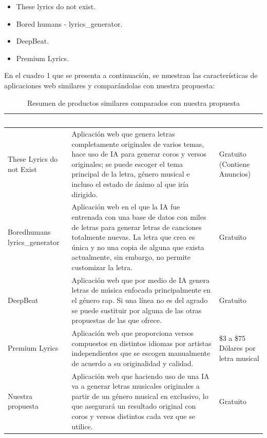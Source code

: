 \documentclass[12pt, a4paper, titlepage]{report}
\begin{document}
    \begin{itemize}
    	\item These lyrics do not exist.
    	\item Bored humans - lyrics\_generator.
    	\item DeepBeat.
    	\item Premium Lyrics.
    \end{itemize}
	\newpage
	En el cuadro 1 que se presenta a continuación, se muestran las características de aplicaciones web similares y comparándolas con nuestra propuesta:
	\begin{table}[!htbp]
		\begin{tabular}{|m{3.5cm}|m{6.5cm}|m{3.5cm}|}
			\hline    			
			\rowcolor{guindapoli}
			\hfil {\textbf{\textcolor{white}{Software}}} & \hfil {\textbf{\textcolor{white}{Características}}} & \hfil {\textbf{\textcolor{white}{Precio}}} \\
			\hline
			These Lyrics do not Exist & Aplicación web que genera letras completamente originales de varios temas, hace uso de IA para generar coros y versos originales; se puede escoger el tema principal de la letra, género musical e incluso el estado de ánimo al que iría dirigido. & Gratuito (Contiene Anuncios) \\
			\hline
			Boredhumans lyrics\_generator & Aplicación web en el que la IA fue entrenada con una base de datos con miles de letras para generar letras de canciones totalmente nuevas. La letra que crea es única y no una copia de alguna que exista actualmente, sin embargo, no permite customizar la letra. & \hfil Gratuito \\
			\hline
			\hfil DeepBeat & Aplicación web que por medio de IA genera letras de música enfocada principalmente en el género rap. Si una línea no es del agrado se puede sustituir por alguna de las otras propuestas de las que ofrece. & \hfil Gratuito \\
			\hline
			\hfil Premium Lyrics & Aplicación web que proporciona versos compuestos en distintos idiomas por artistas independientes que se escogen manualmente de acuerdo a su originalidad y calidad. & \$3 a \$75 Dólares por letra musical \\
			\hline
			\hfil Nuestra propuesta & Aplicación web que haciendo uso de una IA va a generar letras musicales originales a partir de un género musical en exclusivo, lo que asegurará un resultado original con coros y versos distintos cada vez que se utilice. & \hfil Gratuito \\
			\hline
		\end{tabular}
		\caption[Resumen de productos similares]{Resumen de productos similares comparados con nuestra propuesta}
\end{table}
\newpage
\end{document}
